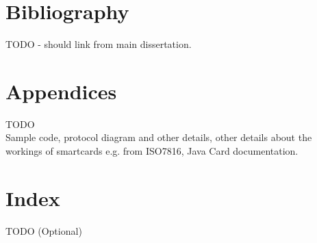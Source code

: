 \documentclass[12pt]{article}
\begin{document}
\pagebreak

\section{Bibliography}
TODO - should link from main dissertation.
\pagebreak

\section{Appendices}
TODO\\
Sample code, protocol diagram and other details, other details about the workings of smartcards e.g. from ISO7816, Java Card documentation.
\pagebreak

\section{Index}
TODO (Optional)
\pagebreak
\end{document}

